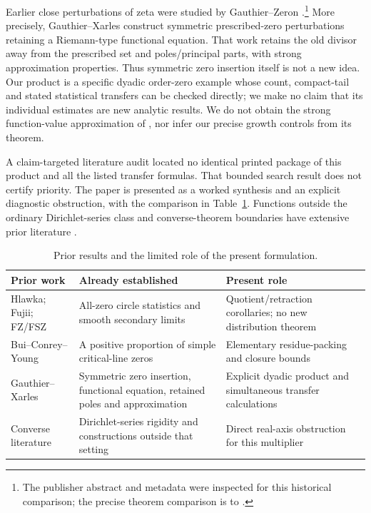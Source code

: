 \documentclass[11pt,a4paper]{article}
\theoremstyle{definition}
\theoremstyle{remark}
\begin{document}
Earlier close perturbations of zeta were studied by Gauthier--Zeron
\cite{GZ}.\footnote{The publisher abstract and metadata were inspected for
this historical comparison; the precise theorem comparison is to \cite{GX}.}
More precisely, Gauthier--Xarles \cite[Proposition 1 and Theorem 2]{GX}
construct symmetric prescribed-zero perturbations retaining a Riemann-type
functional equation. That work retains the
old divisor away from the prescribed set and poles/principal parts, with
strong approximation properties. Thus symmetric zero insertion itself is
not a new idea. Our product is a specific dyadic order-zero example whose
count, compact-tail and stated statistical transfers can be checked
directly; we make no claim that its individual estimates are new analytic
results. We do not obtain the strong function-value approximation of
\cite{GX}, nor infer our precise growth controls from its theorem.

A claim-targeted literature audit located no identical printed package of
this product and all the listed transfer formulas. That bounded search
result does not certify priority. The paper is presented as a worked
synthesis and an explicit diagnostic obstruction, with the comparison in
Table~\ref{tab:prior}. Functions outside the ordinary Dirichlet-series
class and converse-theorem boundaries have extensive prior literature
\cite{KMP,Burnol,Nakamura}.

\begin{table}[tbp]
\centering\small
\caption{Prior results and the limited role of the present formulation.}
\label{tab:prior}
\begin{tabular}{@{}>{\raggedright\arraybackslash}p{.24\linewidth}>{\raggedright\arraybackslash}p{.35\linewidth}>{\raggedright\arraybackslash}p{.34\linewidth}@{}}
\toprule
Prior work & Already established & Present role \\
\midrule
Hlawka; Fujii; FZ/FSZ \cite{FZ,FSZ}
& All-zero circle statistics and smooth secondary limits
& Quotient/retraction corollaries; no new distribution theorem \\
\addlinespace
Bui--Conrey--Young \cite{BCY}
& A positive proportion of simple critical-line zeros
& Elementary residue-packing and closure bounds \\
\addlinespace
Gauthier--Xarles \cite{GX}
& Symmetric zero insertion, functional equation, retained poles and approximation
& Explicit dyadic product and simultaneous transfer calculations \\
\addlinespace
Converse literature \cite{KMP,Burnol,Nakamura}
& Dirichlet-series rigidity and constructions outside that setting
& Direct real-axis obstruction for this multiplier \\
\bottomrule
\end{tabular}
\end{table}
\end{document}
